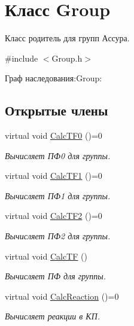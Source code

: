 \hypertarget{class_group}{
\section{Класс Group}
\label{class_group}
}


Класс родитель для групп Ассура.  




{\ttfamily \#include $<$Group.h$>$}



Граф наследования:Group:
\subsection*{Открытые члены}
\begin{DoxyCompactItemize}
\item 
virtual void \hyperlink{class_group_a97560c6c535ded0efecd0ae000980111}{CalcTF0} ()=0
\begin{DoxyCompactList}\small\item\em Вычисляет ПФ0 для группы. \item\end{DoxyCompactList}\item 
virtual void \hyperlink{class_group_a12841149b92385cae555c58057d1369a}{CalcTF1} ()=0
\begin{DoxyCompactList}\small\item\em Вычисляет ПФ1 для группы. \item\end{DoxyCompactList}\item 
virtual void \hyperlink{class_group_a6e5bdd7e790ec9f64df582f0bf633dd9}{CalcTF2} ()=0
\begin{DoxyCompactList}\small\item\em Вычисляет ПФ2 для группы. \item\end{DoxyCompactList}\item 
virtual void \hyperlink{class_group_ae5cb87d12d7232b708455fd6179a34d3}{CalcTF} ()
\begin{DoxyCompactList}\small\item\em Вычисляет ПФ для группы. \item\end{DoxyCompactList}\item 
virtual void \hyperlink{class_group_a279cef80ab134c00aae391ba9f7cff4f}{CalcReaction} ()=0
\begin{DoxyCompactList}\small\item\em Вычисляет реакции в КП. \item\end{DoxyCompactList}\item 

\end{DoxyCompactItemize}
